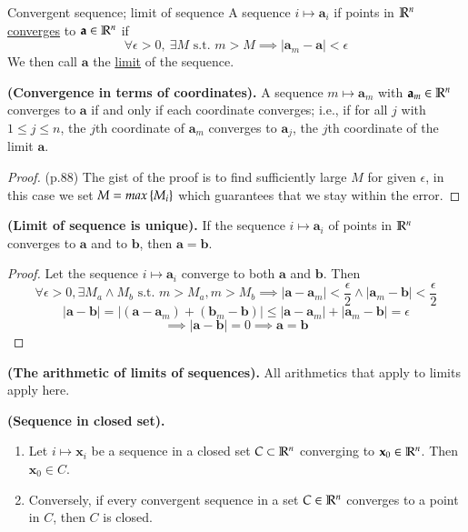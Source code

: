 
\begin{defn}{Convergent sequence; limit of sequence}
A sequence $i \mapsto \bm{a}_i$ if points in $\mathbb{R}^n$ \ul{converges} to $\textbf{a}\in \mathbb{R}^n$ if
\[\forall \epsilon > 0,\ \exists M \text{ s.t. } m > M \implies |\bm{a}_m-\bm{a}| < \epsilon\]
We then call $\bm{a}$ the \ul{limit} of the sequence.
\end{defn}

\begin{proposition}
  \textbf{(Convergence in terms of coordinates).} A sequence $m\mapsto \bm{a}_m$ with $\textbf{a}_m\in\mathbb{R}^n$ converges to $\bm{a}$ if and only if each coordinate converges; i.e., if for all $j$ with $1\leq j\leq n$, the $j$th coordinate of $\bm{a}_m$ converges to $\bm{a}_j$, the $j$th coordinate of the limit $\bm{a}$.
\end{proposition}

\begin{proof}
(p.88) The gist of the proof is to find sufficiently large $M$ for given $\epsilon$, in this case we set $M = max\left\{ M_i \right\}$ which guarantees that we stay within the error. 
\end{proof}

\begin{proposition}
\textbf{(Limit of sequence is unique). } If the sequence $i\mapsto \bm{a}_i$ of points in $\mathbb{R}^n$ converges to $\bm{a}$ and to $\bm{b}$, then $\bm{a}=\bm{b}$.
\end{proposition}

\begin{proof}
Let the sequence $i\mapsto \bm{a}_i$ converge to both $\bm{a}$ and $\bm{b}$. Then \[\forall \epsilon > 0, \exists M_a \land M_b \text{ s.t. } m > M_a, m > M_b \implies |\bm{a}-\bm{a}_{m}| < \frac{\epsilon}{2} \land |\bm{a}_{m} - \bm{b}| < \frac{\epsilon}{2}\]
\[|\bm{a}-\bm{b}|=|(\bm{a}-\bm{a}_m)+(\bm{b}_m-\bm{b})| \leq |\bm{a}-\bm{a}_{m}|+ |\bm{a}_{m} - \bm{b}| = \epsilon\]
\[\implies |\bm{a}-\bm{b}| = 0 \implies \bm{a}=\bm{b}\]
\end{proof}

\begin{theorem}
\textbf{(The arithmetic of limits of sequences). } All arithmetics that apply to limits apply here.
\end{theorem}

\begin{proposition}
\textbf{(Sequence in closed set).}
\begin{enumerate}
  \item Let $i\mapsto \bm{x}_i$ be a sequence in a closed set $C \subset \mathbb{R}^n$ converging to $\textbf{x}_0\in \mathbb{R}^n$. Then $\bm{x}_0\in C$.
  \item Conversely, if every convergent sequence in a set $C \in \mathbb{R}^n$ converges to a point in $C$, then $C$ is closed. 
\end{enumerate}
\end{proposition}
